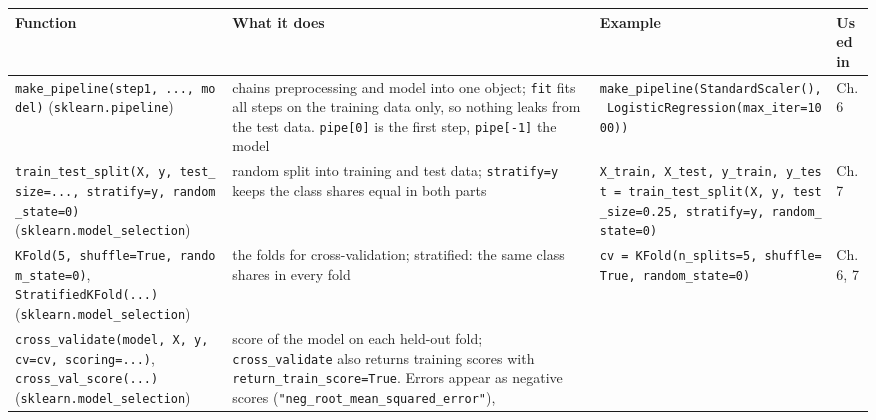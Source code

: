 \documentclass[
  letterpaper,
  DIV=11,
  numbers=noendperiod]{scrreprt}
\begin{document}
\begin{longtable}[]{@{}
  >{\raggedright\arraybackslash}p{}
  >{\raggedright\arraybackslash}p{}
  >{\raggedright\arraybackslash}p{}
  >{\raggedright\arraybackslash}p{}@{}}
\toprule\noalign{}
\begin{minipage}[b]{\linewidth}\raggedright
Function
\end{minipage} & \begin{minipage}[b]{\linewidth}\raggedright
What it does
\end{minipage} & \begin{minipage}[b]{\linewidth}\raggedright
Example
\end{minipage} & \begin{minipage}[b]{\linewidth}\raggedright
Used in
\end{minipage} \\
\midrule\noalign{}
\endhead
\bottomrule\noalign{}
\endlastfoot
\texttt{make\_pipeline(step1,\ ...,\ model)} (\texttt{sklearn.pipeline})
& chains preprocessing and model into one object; \texttt{fit} fits all
steps on the training data only, so nothing leaks from the test data.
\texttt{pipe{[}0{]}} is the first step, \texttt{pipe{[}-1{]}} the model
&
\texttt{make\_pipeline(StandardScaler(),\ LogisticRegression(max\_iter=1000))}
& Ch. 6 \\
\texttt{train\_test\_split(X,\ y,\ test\_size=...,\ stratify=y,\ random\_state=0)}
(\texttt{sklearn.model\_selection}) & random split into training and
test data; \texttt{stratify=y} keeps the class shares equal in both
parts &
\texttt{X\_train,\ X\_test,\ y\_train,\ y\_test\ =\ train\_test\_split(X,\ y,\ test\_size=0.25,\ stratify=y,\ random\_state=0)}
& Ch. 7 \\
\texttt{KFold(5,\ shuffle=True,\ random\_state=0)},
\texttt{StratifiedKFold(...)} (\texttt{sklearn.model\_selection}) & the
folds for cross-validation; stratified: the same class shares in every
fold &
\texttt{cv\ =\ KFold(n\_splits=5,\ shuffle=True,\ random\_state=0)} &
Ch. 6, 7 \\
\texttt{cross\_validate(model,\ X,\ y,\ cv=cv,\ scoring=...)},
\texttt{cross\_val\_score(...)} (\texttt{sklearn.model\_selection}) &
score of the model on each held-out fold; \texttt{cross\_validate} also
returns training scores with \texttt{return\_train\_score=True}. Errors
appear as negative scores (\texttt{"neg\_root\_mean\_squared\_error"}),

\end{longtable}
\end{document}
